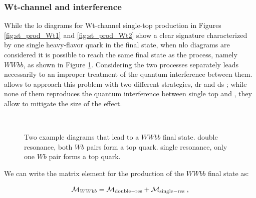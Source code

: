 \subsubsection*{Wt-channel and \ttbar interference}

While the \gls{lo} diagrams for Wt-channel single-top production in Figures \ref{fig:st_prod_Wt1} and \ref{fig:st_prod_Wt2} show a clear signature characterized by one single heavy-flavor quark in the final state,
when \gls{nlo} diagrams are considered it is possible to reach the same final state as the \ttbar process, namely $WWbb$, as shown in Figure \ref{fig:WWbb_int}. 
Considering the two processes separately leads necessarily to an improper treatment of the quantum interference between them.
\PowhegBox allows to approach this problem with two different strategies, \gls{dr} and \gls{ds} \cite{Frixione:2005vw}; while none of them reproduces the quantum interference between single top and \ttbar, they allow to mitigate the size of the effect. 

\begin{figure}[h]
\centering 
{}$\;\;\;\;\;\;$
\caption{Two example diagrams that lead to a $WWbb$ final state.  double resonance, both $Wb$ pairs form a top quark.  single resonance, only one $Wb$ pair forms a top quark.}\label{fig:WWbb_int}
\end{figure}


We can write the matrix element for the production of the $WWbb$ final state as:

\begin{equation}
\mathcal{M}_{WWbb} = \mathcal{M}_{\rm{double-res}} + \mathcal{M}_{\rm{single-res}} \; , \nonumber
\end{equation}

